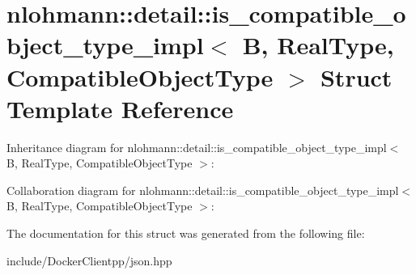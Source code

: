 \hypertarget{structnlohmann_1_1detail_1_1is__compatible__object__type__impl}{}\section{nlohmann\+::detail\+::is\+\_\+compatible\+\_\+object\+\_\+type\+\_\+impl$<$ B, Real\+Type, Compatible\+Object\+Type $>$ Struct Template Reference}
\label{structnlohmann_1_1detail_1_1is__compatible__object__type__impl}


Inheritance diagram for nlohmann\+::detail\+::is\+\_\+compatible\+\_\+object\+\_\+type\+\_\+impl$<$ B, Real\+Type, Compatible\+Object\+Type $>$\+:


Collaboration diagram for nlohmann\+::detail\+::is\+\_\+compatible\+\_\+object\+\_\+type\+\_\+impl$<$ B, Real\+Type, Compatible\+Object\+Type $>$\+:


The documentation for this struct was generated from the following file\+:\begin{DoxyCompactItemize}
\item 
include/\+Docker\+Clientpp/json.\+hpp\end{DoxyCompactItemize}
